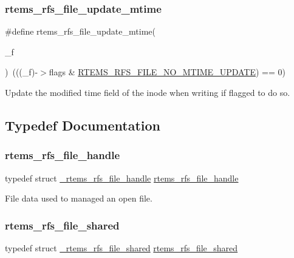\subsubsection{\texorpdfstring{rtems\_rfs\_file\_update\_mtime}{rtems\_rfs\_file\_update\_mtime}}
{\footnotesize\ttfamily \#define rtems\+\_\+rfs\+\_\+file\+\_\+update\+\_\+mtime(\begin{DoxyParamCaption}\item[{}]{\+\_\+f }\end{DoxyParamCaption})~(((\+\_\+f)-\/$>$flags \& \mbox{\hyperlink{rtems-rfs-file_8h_a3f537f7b4684a012ca3e27bf608b9ac3}{R\+T\+E\+M\+S\+\_\+\+R\+F\+S\+\_\+\+F\+I\+L\+E\+\_\+\+N\+O\+\_\+\+M\+T\+I\+M\+E\+\_\+\+U\+P\+D\+A\+TE}}) == 0)}

Update the modified time field of the inode when writing if flagged to do so. 

\subsection{Typedef Documentation}
\mbox{\label{rtems-rfs-file_8h_a35a0f4ad45bd35ea0af7df0aa0ad893b}} 
\subsubsection{\texorpdfstring{rtems\_rfs\_file\_handle}{rtems\_rfs\_file\_handle}}
{\footnotesize\ttfamily typedef struct \mbox{\hyperlink{struct__rtems__rfs__file__handle}{\+\_\+rtems\+\_\+rfs\+\_\+file\+\_\+handle}}  \mbox{\hyperlink{rtems-rfs-file_8h_a35a0f4ad45bd35ea0af7df0aa0ad893b}{rtems\+\_\+rfs\+\_\+file\+\_\+handle}}}

File data used to managed an open file. \mbox{\label{rtems-rfs-file_8h_adb93e0b8dc15817a098cb105949cc3c7}} 
\subsubsection{\texorpdfstring{rtems\_rfs\_file\_shared}{rtems\_rfs\_file\_shared}}
{\footnotesize\ttfamily typedef struct \mbox{\hyperlink{struct__rtems__rfs__file__shared}{\+\_\+rtems\+\_\+rfs\+\_\+file\+\_\+shared}}  \mbox{\hyperlink{rtems-rfs-file_8h_adb93e0b8dc15817a098cb105949cc3c7}{rtems\+\_\+rfs\+\_\+file\+\_\+shared}}}

